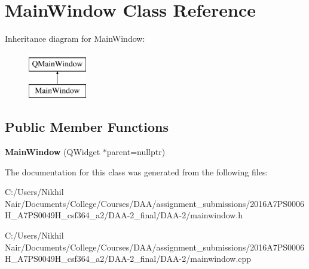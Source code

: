 \hypertarget{class_main_window}{}\section{Main\+Window Class Reference}
\label{class_main_window}
Inheritance diagram for Main\+Window\+:\begin{figure}[H]
\begin{center}
\leavevmode
\includegraphics[height=2.000000cm]{class_main_window}
\end{center}
\end{figure}
\subsection*{Public Member Functions}
\begin{DoxyCompactItemize}
\item 
\mbox{\label{class_main_window_a996c5a2b6f77944776856f08ec30858d}} 
{\bfseries Main\+Window} (Q\+Widget $\ast$parent=nullptr)
\end{DoxyCompactItemize}


The documentation for this class was generated from the following files\+:\begin{DoxyCompactItemize}
\item 
C\+:/\+Users/\+Nikhil Nair/\+Documents/\+College/\+Courses/\+D\+A\+A/assignment\+\_\+submissions/2016\+A7\+P\+S0006\+H\+\_\+A7\+P\+S0049\+H\+\_\+csf364\+\_\+a2/\+D\+A\+A-\/2\+\_\+final/\+D\+A\+A-\/2/mainwindow.\+h\item 
C\+:/\+Users/\+Nikhil Nair/\+Documents/\+College/\+Courses/\+D\+A\+A/assignment\+\_\+submissions/2016\+A7\+P\+S0006\+H\+\_\+A7\+P\+S0049\+H\+\_\+csf364\+\_\+a2/\+D\+A\+A-\/2\+\_\+final/\+D\+A\+A-\/2/mainwindow.\+cpp\end{DoxyCompactItemize}
